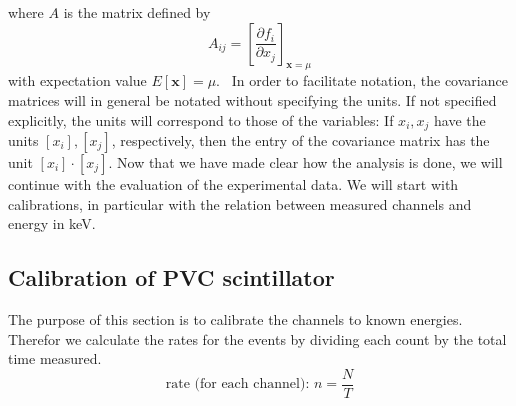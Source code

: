where $A$ is the matrix defined by 
\begin{equation}
    A_{ij} = \left[ \frac{\partial f_i}{\partial x_j}\right]_{\mathbf{x} = \mu}
\end{equation}
with expectation value $E[\mathbf{x}] = \mu$.~\cite{cowan1998statistical}
In order to facilitate notation, the covariance matrices will in general be notated without 
specifying the units. If not specified explicitly, the units will correspond to those of the
variables: If $x_i, x_j$ have the units $[x_i], [x_j]$, respectively, 
then the entry of the covariance matrix has the unit $[x_i] \cdot [x_j]$. 
Now that we have made clear how the analysis is done, we will
continue with the evaluation of the experimental data. We will
start with calibrations, in particular with the relation between
measured channels and energy in keV.
\clearpage


\subsection{Calibration of PVC scintillator}
\label{sub:calibration}
The purpose of this section is to calibrate the channels to
known energies. Therefor we calculate the  rates for the
events by dividing each count by the total time measured. 
\begin{equation}
    \text{rate (for each channel): } n  = 	\frac{N}{T}
    \label{eq:rate}
\end{equation}

